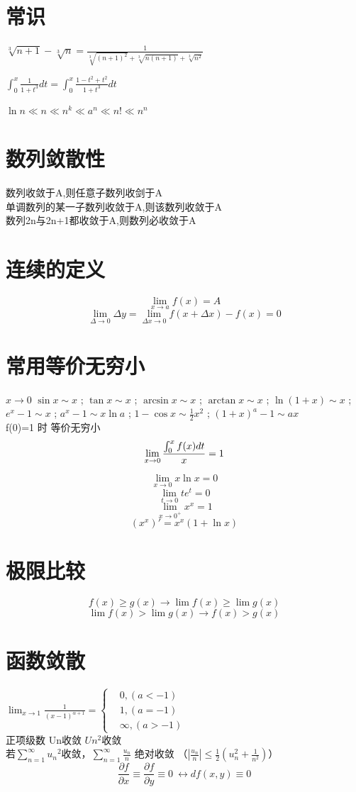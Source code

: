 \documentclass[UTF8]{ctexart}
\begin{document}
\section{常识}
$\sqrt[3]{n+1}-\sqrt[3]{n}=\frac{1}{\sqrt[3]{{(n+1)}^2}+\sqrt[3]{n(n+1)}+\sqrt[3]{n^2}}$

$\int_0^x\frac{1}{1+t^3}dt=\int_0^x\frac{1-t^2+t^2}{1+t^3}dt$

$\ln n \ll n \ll n^k \ll a^n \ll n! \ll n^n$


\section{数列敛散性}
数列收敛于A,则任意子数列收剑于A   \\
单调数列的某一子数列收敛于A,则该数列收敛于A \\
数列{2n}与{2n+1}都收敛于A,则数列必收敛于A

\section{连续的定义}
$$ \lim_{x\rightarrow a}f(x)=A$$
$$ \lim_{\Delta\rightarrow0}\Delta y=\lim_{\Delta x \rightarrow 0 } f(x+ \Delta x) - f(x)=0$$

\section{常用等价无穷小}
 $ x \rightarrow 0$
$ \sin x \sim x$ ; $ \tan x \sim x$ ; $ \arcsin x \sim x$ ; $ \arctan x \sim x$ ; $ \ln({1+x}) \sim x $ ; $ e^x -1 \sim x$ ; $ a^x -1 \sim x \ln a $ ; $ 1-\cos x \sim \frac{1}{2} x^2 $ ; $ {(1+x)}^a -1 \sim ax$ \\

f(0)=1 时 等价无穷小 \\
$$ \lim_{x \rightarrow 0 } {{\int_0^x f(x)dt} \over {x}} =1$$

$$ \lim_{x \rightarrow 0} x \ln x =0$$
$$\lim_{t \rightarrow 0} t e^t =0 $$
$$\lim _{x \rightarrow 0^+} x^x =1$$
$$(x^x)'=x^x(1+ \ln x)$$

\section{极限比较}
$$ f(x) \geq g(x) \rightarrow \lim f(x) \geq \lim g(x) $$
$$ \lim f(x) > \lim g(x) \rightarrow f(x) > g(x) $$
\section{函数敛散}
$ \lim_{x \rightarrow 1} \frac{1}{(x-1)^{α+1}}=
  \begin{cases}
  &0 , (a<-1) \\
  &1 , (a=-1) \\
  &\infty ,(a>-1)
\end{cases}$ \\
正项级数 Un收敛 $Un^2$收敛 \\
若$\sum_{n=1}^\infty {u_n}^2 $收敛，$\sum_{n=1}^\infty \frac{u_n}{n} $ 绝对收敛
（$\left\vert \frac{u_n}{n} \right\vert \leq  \frac{1}{2} (u_n^2 + \frac{1}{n^2})$）
$$ \frac{\partial f}{\partial x} \equiv \frac{\partial f}{\partial y} \equiv 0\ \leftrightarrow df({x,y}) \equiv 0 $$
\end{document}
